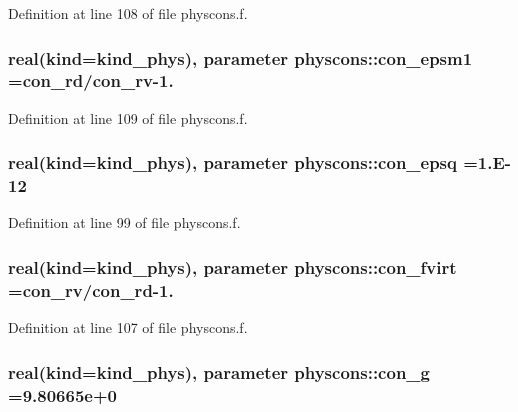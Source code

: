 Definition at line 108 of file physcons.\+f.

\subsubsection[{\texorpdfstring{con\+\_\+epsm1}{con_epsm1}}]{\setlength{\rightskip}{0pt plus 5cm}real(kind=kind\+\_\+phys), parameter physcons\+::con\+\_\+epsm1 ={\bf con\+\_\+rd}/{\bf con\+\_\+rv}-\/1.}\hypertarget{namespacephyscons_a2ca326d6f385fb0100c05ed44b20c345}{}\label{namespacephyscons_a2ca326d6f385fb0100c05ed44b20c345}


Definition at line 109 of file physcons.\+f.

\subsubsection[{\texorpdfstring{con\+\_\+epsq}{con_epsq}}]{\setlength{\rightskip}{0pt plus 5cm}real(kind=kind\+\_\+phys), parameter physcons\+::con\+\_\+epsq =1.\+E-\/12}\hypertarget{namespacephyscons_a990a4a07e2e5e963cac6fd0a9d5939ea}{}\label{namespacephyscons_a990a4a07e2e5e963cac6fd0a9d5939ea}


Definition at line 99 of file physcons.\+f.

\subsubsection[{\texorpdfstring{con\+\_\+fvirt}{con_fvirt}}]{\setlength{\rightskip}{0pt plus 5cm}real(kind=kind\+\_\+phys), parameter physcons\+::con\+\_\+fvirt ={\bf con\+\_\+rv}/{\bf con\+\_\+rd}-\/1.}\hypertarget{namespacephyscons_ad200a2d8149c61dbdd05124ce977a928}{}\label{namespacephyscons_ad200a2d8149c61dbdd05124ce977a928}


Definition at line 107 of file physcons.\+f.

\subsubsection[{\texorpdfstring{con\+\_\+g}{con_g}}]{\setlength{\rightskip}{0pt plus 5cm}real(kind=kind\+\_\+phys), parameter physcons\+::con\+\_\+g =9.\+80665e+0}\hypertarget{namespacephyscons_a7aa20dba53943ce9bcecb2ebef0e308d}{}\label{namespacephyscons_a7aa20dba53943ce9bcecb2ebef0e308d}


